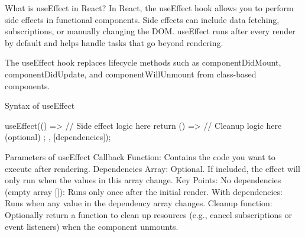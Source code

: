 What is useEffect in React?
In React, the useEffect hook allows you to perform side effects in functional components. Side effects can include data fetching, subscriptions, or manually changing the DOM. useEffect runs after every render by default and helps handle tasks that go beyond rendering.

The useEffect hook replaces lifecycle methods such as componentDidMount, componentDidUpdate, and componentWillUnmount from class-based components.

Syntax of useEffect

useEffect(() => {
  // Side effect logic here
  return () => {
    // Cleanup logic here (optional)
  };
}, [dependencies]);


Parameters of useEffect
Callback Function: Contains the code you want to execute after rendering.
Dependencies Array: Optional. If included, the effect will only run when the values in this array change.
Key Points:
No dependencies (empty array []): Runs only once after the initial render.
With dependencies: Runs when any value in the dependency array changes.
Cleanup function: Optionally return a function to clean up resources (e.g., cancel subscriptions or event listeners) when the component unmounts.